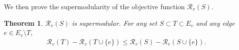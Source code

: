 \documentclass{article}
\def\kh#1{\left( #1 \right)}
\newcommand\ee{\boldsymbol{\mathit{e}}}
\newcommand\LL{\bm{\mathit{L}}}
\def\trace#1{\mathrm{Tr} \left(#1 \right)}
\newtheorem{theorem}[theo]{Theorem}
\begin{document}
We then prove the supermodularity of the objective function $\mathcal{R}_v(S)$.
\begin{theorem}\label{thm:SM}
$\mathcal{R}_v(S)$ is supermodular. For any set $S \subset T \subset E_v$ and any edge $e \in E_v \setminus T$,
\begin{align*}
\mathcal{R}_v(T) - \mathcal{R}_v(T \cup \{ e \} ) \leq \mathcal{R}_v(S) - \mathcal{R}_v(S \cup \{ e \} ).
\end{align*}
\end{theorem}
\end{document}
